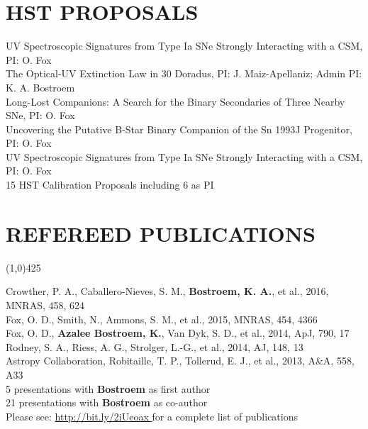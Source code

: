 \documentclass{res}
\begin{document}
\begin{resume}
\section{HST PROPOSALS}
UV Spectroscopic Signatures from Type Ia SNe Strongly Interacting with a CSM, PI: O. Fox \\
The Optical-UV Extinction Law in 30 Doradus, PI: J. Maiz-Apellaniz; Admin PI: K. A. Bostroem \\
Long-Lost Companions: A Search for the Binary Secondaries of Three Nearby SNe, PI: O. Fox \\
Uncovering the Putative B-Star Binary Companion of the Sn 1993J Progenitor, PI: O. Fox\\
UV Spectroscopic Signatures from Type Ia SNe Strongly Interacting with a CSM, PI: O. Fox \\
15 HST Calibration Proposals including 6 as PI

\section{REFEREED PUBLICATIONS}
\vspace{-.2in} 
\begin{center}
\line(1,0){425}
\end{center}
\vspace{-.25in} 
\vspace{0.1in}
Crowther, P. A., Caballero-Nieves, S. M., {\bf Bostroem, K. A.}, et al., 2016, MNRAS, 458, 624\\
Fox, O. D., Smith, N., Ammons, S. M., et al., 2015, MNRAS, 454, 4366\\
Fox, O. D., {\bf Azalee Bostroem, K.}, Van Dyk, S. D., et al., 2014, ApJ, 790, 17\\
Rodney, S. A., Riess, A. G., Strolger, L.-G., et al., 2014, AJ, 148, 13\\
Astropy Collaboration, Robitaille, T. P., Tollerud, E. J., et al., 2013, A\&A, 558, A33 \\
5 presentations with {\bf Bostroem} as first author \\
21 presentations with {\bf Bostroem} as co-author \\
Please see: \color{blue}\url{http://bit.ly/2iUeoax }\color{black}\hspace*{0pt} for a complete list of publications \\


\end{resume}
\end{document}
